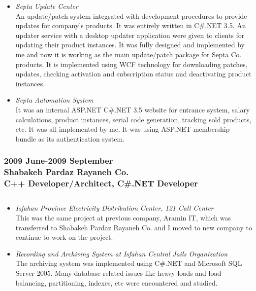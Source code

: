 \documentclass[10pt,a4paper]{article}
\begin{document}
\begin{itemize}
		\item \small \textit{Septa Update Center} \\
			An update/patch system integrated with development procedures to provide updates for company's products. It was entirely written in C\#.NET 3.5. An updater service with a desktop updater application were given to clients for updating their product instances. It was fully designed and implemented by me and now it is working as the main update/patch package for Septa Co. products. It is implemented using WCF technology for downloading patches, updates, checking activation and subscription status and deactivating product instances. \\
		\item \small \textit{Septa Automation System} \\
			It was an internal ASP.NET C\#.NET 3.5 website for entrance system, salary calculations, product instances, serial code generation, tracking sold products, etc. It was all implemented by me. It was using ASP.NET membership bundle as its authentication system.
  \end{itemize}
  \setlength{\leftskip}{0pt}
  \setlength{\rightskip}{0cm}

\subsubsection{\textnormal {2009 June-2009 September} \\ \textnormal {Shabakeh Pardaz Rayaneh Co.} \\ C++ Developer/Architect, C\#.NET Developer}
\subsection{}
  \setlength{\leftskip}{0.5cm}
  \setlength{\rightskip}{1cm}
	\begin{itemize}
		\item \small \textit{Isfahan Province Electricity Distribution Center, 121 Call Center} \\
		This was the same project at previous company, Aramin IT, which was transferred to Shabakeh Pardaz Rayaneh Co. and I moved to new company to continue to work on the project. \\
		\item \small \textit{Recording and Archiving System at Isfahan Central Jails Organization} \\
		The archiving system was implemented using C\#.NET and Microsoft SQL Server 2005. Many database related issues like heavy loads and load balancing, partitioning, indexes, etc were encountered and studied.
	\end{itemize}
	\setlength{\leftskip}{0pt}
  \setlength{\rightskip}{0cm}
		
\end{document}

